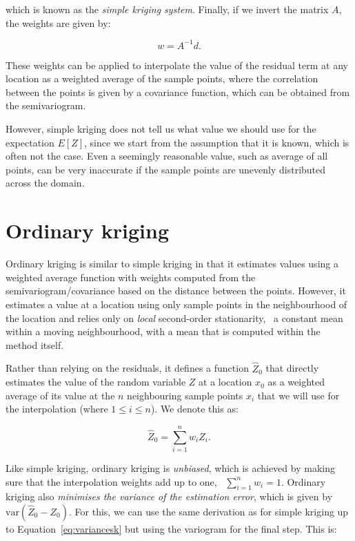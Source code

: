 which is known as the \emph{simple kriging system}.
Finally, if we invert the matrix \(A\), the weights are given by:

\begin{equation}
w = A^{-1}d.
\end{equation}

These weights can be applied to interpolate the value of the residual term at any location as a weighted average of the sample points, where the correlation between the points is given by a covariance function, which can be obtained from the semivariogram.

However, simple kriging does not tell us what value we should use for the expectation \(E[Z]\), since we start from the assumption that it is known, which is often not the case.
Even a seemingly reasonable value, such as average of all points, can be very inaccurate if the sample points are unevenly distributed across the domain.

\section{Ordinary kriging}%

Ordinary kriging is similar to simple kriging in that it estimates values using a weighted average function with weights computed from the semivariogram/covariance based on the distance between the points. 
However, it estimates a value at a location using only sample points in the neighbourhood of the location and relies only on \emph{local} second-order stationarity, \ie\ a constant mean within a moving neighbourhood, with a mean that is computed within the method itself.

Rather than relying on the residuals, it defines a function \(\hat{Z}_0\) that directly estimates the value of the random variable \(Z\) at a location \(x_0\) as a weighted average of its value at the \(n\) neighbouring sample points \(x_i\) that we will use for the interpolation (where \(1 \leq i \leq n\)).
We denote this as:

\begin{equation}
\label{eq:waok}
\hat{Z}_0 = \sum_{i=1}^n w_i Z_i.
\end{equation}

Like simple kriging, ordinary kriging is \emph{unbiased}, which is achieved by making sure that the interpolation weights add up to one, \ie\ \(\sum_{i=1}^n w_i = 1\).
Ordinary kriging also \emph{minimises the variance of the estimation error}, which is given by \(\mathrm{var}\left(\hat{Z}_0 - Z_0\right)\).
For this, we can use the same derivation as for simple kriging up to Equation~\ref{eq:variancesk} but using the variogram for the final step.
This is:

